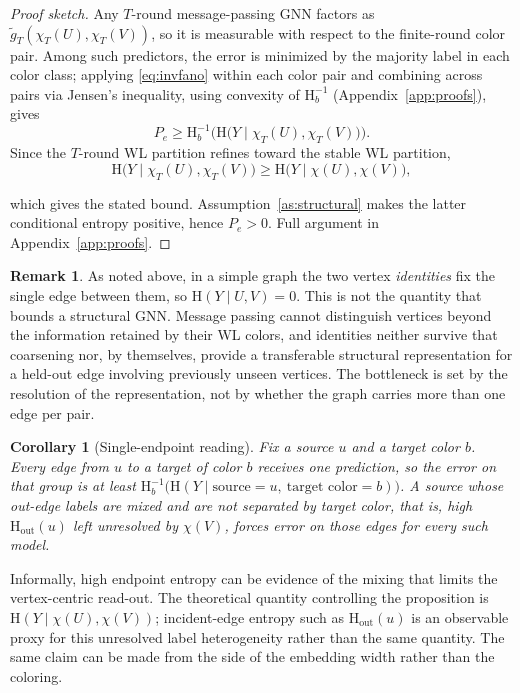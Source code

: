 \documentclass[sigconf, review, anonymous]{acmart}
\newcommand{\Hh}{\mathrm{H}}
\newcommand{\outdeg}{\mathrm{out}}
\theoremstyle{plain}
\newtheorem{corollary}{Corollary}
\theoremstyle{definition}
\newtheorem{remark}{Remark}
\begin{document}
\begin{proof}[Proof sketch]
Any $T$-round message-passing GNN factors as $\tilde g_T(\chi_T(U),\chi_T(V))$, so it is measurable with respect to the finite-round color pair. Among such predictors, the error is minimized by the majority label in each color class; applying \eqref{eq:invfano} within each color pair and combining across pairs via Jensen's inequality, using convexity of $\Hh_b^{-1}$ (Appendix~\ref{app:proofs}), gives 
\begin{equation}   
P_e \ge \Hh_b^{-1}\Big(\Hh\big(Y\mid\chi_T(U),\chi_T(V)\big) \Big).
\end{equation}
Since the $T$-round WL partition refines toward the stable WL partition,
\begin{equation}   
\Hh\big(Y\mid\chi_T(U),\chi_T(V)\big) \ge \Hh\big(Y\mid\chi(U),\chi(V)\big),
\end{equation}

which gives the stated bound. Assumption~\ref{as:structural} makes the latter conditional entropy positive, hence $P_e>0$. Full argument in Appendix~\ref{app:proofs}.
\end{proof}

\begin{remark}
As noted above, in a simple graph the two vertex \emph{identities} fix the single edge between them, so $\Hh(Y\mid U,V)=0$. This is not the quantity that bounds a structural GNN. Message passing cannot distinguish vertices beyond the information retained by their WL colors, and identities neither survive that coarsening nor, by themselves, provide a transferable structural representation for a held-out edge involving previously unseen vertices. The bottleneck is set by the resolution of the representation, not by whether the graph carries more than one edge per pair.\end{remark}

\begin{corollary}[Single-endpoint reading]
\label{cor:endpoint}
Fix a source $u$ and a target color $b$. Every edge from $u$ to a target of color $b$ receives one prediction, so the error on that group is at least $\Hh_b^{-1}\big(\Hh(Y\mid \text{source}{=}u,\ \text{target color}{=}b)\big)$. A source whose out-edge labels are mixed and are not separated by target color, that is, high $\Hh_\outdeg(u)$ left unresolved by $\chi(V)$, forces error on those edges for every such model.
\end{corollary}

Informally, high endpoint entropy can be evidence of the mixing that limits the vertex-centric read-out. The theoretical quantity controlling the proposition is $\Hh(Y\mid\chi(U),\chi(V))$; incident-edge entropy such as $\Hh_\outdeg(u)$ is an observable proxy for this unresolved label heterogeneity rather than the same quantity. The same claim can be made from the side of the embedding width rather than the coloring. 
\end{document}
